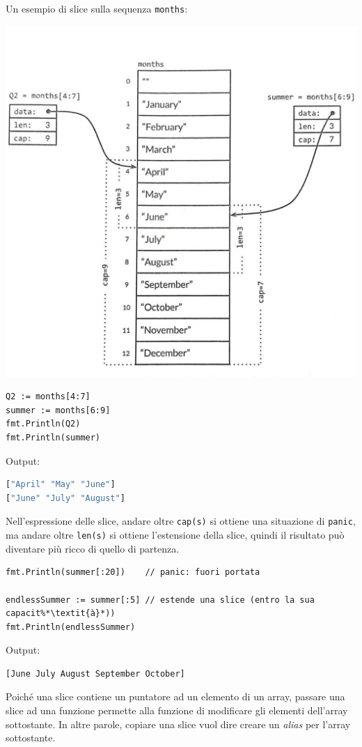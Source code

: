 \documentclass[../../thesis.tex]{subfiles}
\begin{document}
    \clearpage
    \newpage
    Un esempio di slice sulla sequenza \verb"months":
    \begin{center}
        \includegraphics[scale = 0.25]{figures/figura-4.1}
    \end{center}
    \begin{lstlisting}[frame = single, label = {lst:lstlisting3-2.2}]
Q2 := months[4:7]
summer := months[6:9]
fmt.Println(Q2)
fmt.Println(summer)
    \end{lstlisting}
    Output:
    \begin{lstlisting}[language = bash, frame = L, label = {lst:lstlisting3-2.3}]
["April" "May" "June"]
["June" "July" "August"]
    \end{lstlisting}
    Nell'espressione delle slice, andare oltre \verb"cap(s)" si ottiene una situazione di \verb"panic", ma andare oltre \verb"len(s)" si ottiene l'estensione della slice, quindi il risultato può diventare più ricco di quello di partenza.
    \begin{lstlisting}[frame = single, label = {lst:lstlisting3-2.4}]
fmt.Println(summer[:20])    // panic: fuori portata

endlessSummer := summer[:5] // estende una slice (entro la sua capacit%*\textit{à}*))
fmt.Println(endlessSummer)
    \end{lstlisting}
    Output:
    \begin{lstlisting}[language = bash, frame = L, label = {lst:lstlisting3-2.5}]
[June July August September October]
    \end{lstlisting}
    Poiché una slice contiene un puntatore ad un elemento di un array, passare una slice ad una funzione permette alla funzione di modificare gli elementi dell'array sottostante.
    In altre parole, copiare una slice vuol dire creare un \textit{alias} per l'array sottostante.
    \hfill \vspace{12pt}
\end{document}
